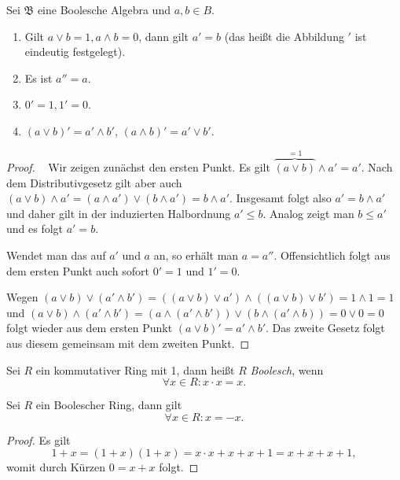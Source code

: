 \begin{lemma}
    Sei $\mathfrak{B}$ eine Boolesche Algebra und $a,b \in B$.
    \begin{enumerate}
        \item Gilt $a \lor b = 1, a \land b = 0$, dann gilt $a' = b$ (das heißt die Abbildung $'$ ist eindeutig festgelegt).
        \item Es ist $a'' = a$.
        \item $0' = 1, 1' = 0$.
        \item $(a \lor b)' = a' \land b'$, $(a \land b)' = a' \lor b'$.
    \end{enumerate}
\end{lemma}
\begin{proof}{\ }
    Wir zeigen zunächst den ersten Punkt. Es gilt $\overbrace{(a\lor b)}^{=1}\land a'=a'$. Nach dem Distributivgesetz gilt aber auch $(a\lor b)\land a'=(a\land a')\lor (b\land a')=b\land a'$. Insgesamt folgt also $a'=b\land a'$ und daher gilt in der induzierten Halbordnung $a'\le b$. Analog zeigt man $b\leq a'$ und es folgt $a'=b$.

    Wendet man das auf $a'$ und $a$ an, so erhält man $a=a''$. Offensichtlich folgt aus dem ersten Punkt auch sofort $0'=1$ und $1'=0$.

    Wegen $(a\lor b)\lor (a'\land b')=((a\lor b)\lor a') \land ((a\lor b)\lor b')=1\land 1=1$ und $(a\lor b)\land (a'\land b')=(a\land (a'\land b'))\lor (b\land(a'\land b))=0\lor 0=0$ folgt wieder aus dem ersten Punkt $(a\lor b)'=a'\land b'$. Das zweite Gesetz folgt aus diesem gemeinsam mit dem zweiten Punkt.
\end{proof}


\begin{definition}
    Sei $R$ ein kommutativer Ring mit 1, dann heißt $R$ \emph{Boolesch}, wenn
    $$ \forall x \in R : x \cdot x = x. $$
\end{definition}

\begin{lemma}
    Sei $R$ ein Boolescher Ring, dann gilt
    $$ \forall x \in R : x = -x. $$
\end{lemma}

\begin{proof}
    Es gilt
    $$ 1 + x = (1+x)(1+x) = x \cdot x + x + x + 1 = x + x + x + 1, $$
    womit durch Kürzen $ 0 = x + x $ folgt.
\end{proof}

